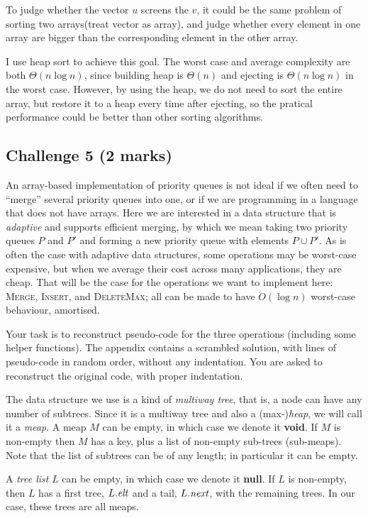 \documentclass[11pt]{article}
\newcommand{\id}[1]{\mbox{\textit{#1}}}
\begin{document}
To judge whether the vector $u$ screens the $v$,
it could be the same problem of sorting two arrays(treat vector as array),
and judge whether every element in one array are bigger than the corresponding
element in the other array.

I use heap sort to achieve this goal. The worst case and average complexity are
both $\Theta(n \log n)$,
since building heap is $\Theta(n)$ and ejecting is $\Theta(n \log n)$
in the worst case.
However, by using the heap, we do not need to sort the
entire array, but restore it to a heap every time after ejecting, so the pratical
performance could be better than other sorting algorithms.
\pagebreak
\subsection*{Challenge 5 \hfill {\small (2 marks)}}

An array-based implementation of priority queues is not ideal if we
often need to ``merge'' several priority queues into one, or if we
are programming in a language that does not have arrays.
Here we are interested in a data structure that is \emph{adaptive}
and supports efficient merging, by which we mean taking two
priority queues $P$ and $P'$ and forming a new priority queue with
elements $P \cup P'$.
As is often the case with adaptive data structures, some operations
may be worst-case expensive, but when we average their cost across many
applications, they are cheap.
That will be the case for the operations we want to implement here:
\textsc{Merge}, \textsc{Insert}, and \textsc{DeleteMax};
all can be made to have $O(\log n)$ worst-case behaviour, amortised.

Your task is to reconstruct pseudo-code for the three operations
(including some helper functions).
The appendix contains a scrambled solution,
with lines of pseudo-code in random order, without any indentation.
You are asked to reconstruct the original code, with proper indentation.

The data structure we use is a kind of \emph{multiway tree},
that is, a node can have any number of subtrees.
Since it is a multiway tree and also a (max-)\emph{heap},
we will call it a \emph{meap}.
A meap $M$ can be empty, in which case we denote it \textbf{void}.
If $M$ is non-empty then $M$ has a key, plus a list of non-empty
sub-trees (sub-meaps).
Note that the list of subtrees can be of any length;
in particular it can be empty.

A \emph{tree list} $L$ can be empty, in which case we denote it
\textbf{null}.
If $L$ is non-empty, then $L$ has a first tree, $L.\id{elt}$ and
a tail, $L.\id{next}$, with the remaining trees.
In our case, these trees are all meaps.
\end{document}
